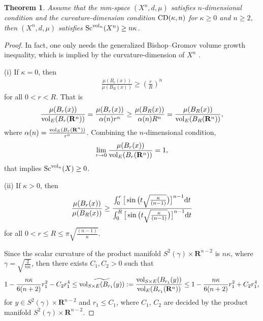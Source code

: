 \documentclass[pdftex]{sigma}
\newtheorem{Theorem}{Theorem}[section]
\begin{document}
\begin{Theorem}
Assume that the mm-space $(X^n, d, \mu)$ satisfies $n$-dimensional condition and the curvature-dimension condition ${\rm CD}(\kappa, n)$ for $\kappa\geq 0$ and $n\geq 2$, then $(X^n, d, \mu)$ satisfies ${\rm Sc}^{{\rm vol}_n}(X^n)\geq n\kappa$.
\end{Theorem}

\begin{proof}
In fact, one only needs the generalized Bishop--Gromov volume growth inequality, which is implied by the curvature-dimension of $X^n$ \cite[Theorem~2.3]{MR2237207}.

 (i) If $\kappa=0$, then
 \begin{gather*}
 \frac{\mu(B_r(x))}{\mu(B_R(x))}\geq \left(\frac{r}{R}\right)^n
 \end{gather*}
 for all $ 0< r <R$. That is
\begin{gather*}
 \frac{\mu(B_r(x))}{{\rm vol}_E(B_r(\mathbf{R}^n))} = \frac{\mu(B_r(x))}{\alpha(n)r^n}\geq \frac{\mu(B_R(x))}{\alpha(n)R^n}=\frac{\mu(B_R(x))}{{\rm vol}_E(B_R(\mathbf{R}^n))},
\end{gather*}
where $\alpha(n)=\frac{{\rm vol}_E(B_r(\mathbf{R}^n))}{r^n}$.
Combining the $n$-dimensional condition,
\begin{gather*}
 \lim\limits_{r \to 0}\frac{\mu(B_r(x))}{{\rm vol}_E(B_r(\mathbf{R}^n))}=1,
\end{gather*}
 that implies ${\rm Sc}^{{\rm vol}_n}(X)\geq 0$.

(ii) If $\kappa >0$, then
\begin{gather*}
\frac{\mu(B_r(x))}{\mu(B_R(x))}\geq \frac{\int_0^r \big[\sin\big(t\sqrt{\frac{\kappa}{(n-1)}}\big)\big]^{n-1}{\rm d}t}{\int_0^R \big[\sin\big(t\sqrt{\frac{\kappa}{(n-1)}}\big)\big]^{n-1}{\rm d}t}
\end{gather*}
 for all $ 0< r \leq R\leq \pi \sqrt{\frac{(n-1)}{\kappa}}$.

Since the scalar curvature of the product manifold $S^2(\gamma)\times \mathbf{R}^{n-2}$ is $n\kappa$, where $\gamma=\sqrt{\frac{2}{n\kappa}}$, then there exists $C_1, C_2 >0$ such that
\begin{gather*}
1 - \frac{n\kappa}{6(n+2)}r_1^2 - C_2r_1^4 \leq \widetilde{{\rm vol}_{S\times E}(B_{r_1}(y))} := \frac{ {\rm vol}_{S\times E}(B_{r_1}(y))}{{\rm vol}_E(B_{r_1}(\mathbf{R}^n))} \leq 1 - \frac{n\kappa}{6(n+2)}r_1^2 + C_2r_1^4,
\end{gather*}
 for $y\in S^2(\gamma)\times \mathbf{R}^{n-2}$ and $r_1\leq C_1$, where $C_1$, $C_2$ are decided by the product manifold $S^2(\gamma)\times \mathbf{R}^{n-2}$.


\end{proof}
\end{document}
